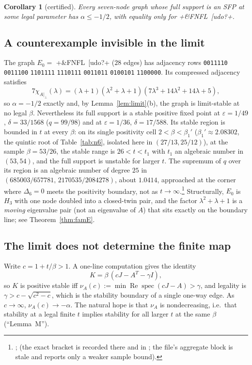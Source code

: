 \documentclass[11pt]{article}
\newtheorem{corollary}[theorem]{Corollary}
\theoremstyle{definition}
\newcommand{\eps}{\varepsilon}
\newcommand{\perpc}[1]{#1|_{\perp}}
\newcommand{\spec}{\operatorname{spec}}
\newcommand{\Rea}{\operatorname{Re}}
\begin{document}
\begin{corollary}[certified]\label{cor:alpha7}
Every seven-node graph whose full support is an SFP at some legal parameter has $\alpha\le-1/2$, with equality only for
\dsix+&FNFL~[udo?+.
\end{corollary}

\subsection{A counterexample invisible in the limit}
The graph $E_0=$ \dsix+&FNFL~[udo?+ ($28$ edges) has adjacency rows \texttt{0011110} \texttt{0011100} \texttt{1101111}
\texttt{1110111} \texttt{0011011} \texttt{0100101} \texttt{1100000}. Its compressed adjacency satisfies
\[
7\chi_{\perpc{A}}(\lambda)=(\lambda+1)(\lambda^2+\lambda+1)(7\lambda^3+14\lambda^2+14\lambda+5),
\]
so $\alpha=-1/2$ exactly and, by Lemma~\ref{lem:limit}(b), the graph is limit-stable at no legal $\beta$. Nevertheless its full
support is a stable positive fixed point at $\eps=1/49$, $\delta=33/1568$ ($q=99/98$) and at $\eps=1/36$, $\delta=17/588$. Its
stable region is bounded in $t$ at every $\beta$: on its single positivity cell $2<\beta<\beta_1'$ ($\beta_1'\approx2.08302$, the quintic root of Table~\ref{tab:n6},
isolated here in $(27/13,25/12)$), at the sample $\beta=53/26$, the stable range is
$26<t<t_1$ with $t_1$ an algebraic number in $(53,54)$, and the full support is unstable for larger $t$. The supremum of $q$
over its region is an algebraic number of degree $25$ in $(685003/657781,\,2170535/2084278)$, about $1.0414$, approached at the
corner where $\Delta_6=0$ meets the positivity boundary, not as $t\to\infty$.\footnote{;  (the exact bracket is recorded there and in ; the file's aggregate block is stale and reports only a weaker sample bound).}
Structurally, $E_0$ is $H_3$ with one node doubled into a closed-twin pair, and the factor $\lambda^2+\lambda+1$ is a \emph{moving}
eigenvalue pair (not an eigenvalue of $A$) that sits exactly on the boundary line; see Theorem~\ref{thm:famE}.

\subsection{The limit does not determine the finite map}
Write $c=1+t/\beta>1$. A one-line computation gives the identity
\begin{equation}\label{eq:E}
K=\beta\,(cJ-A^T-\gamma I),
\end{equation}
so $K$ is positive stable iff $\nu_A(c):=\min\Rea\spec(cJ-A)>\gamma$, and legality is $\gamma>c-\sqrt{c^2-c}$, which is the
stability boundary of a single one-way edge. As $c\to\infty$, $\nu_A(c)\to-\alpha$. The natural hope is that
$\nu_A$ is nondecreasing, i.e.\ that stability at a legal finite $t$ implies stability for all larger $t$ at the same $\beta$
(``Lemma~M'').
\end{document}
